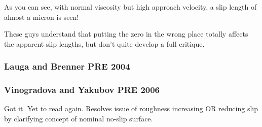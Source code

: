 \documentclass[twocolumn]{article}
\begin{document}
As you can see, with normal viscosity but high approach velocity, a slip length of almost a micron is seen!

These guys understand that putting the zero in the wrong place totally affects the apparent slip lengths, but don't quite develop a full critique.

\subsubsection*{Lauga and Brenner PRE 2004}



\subsubsection*{Vinogradova and Yakubov PRE 2006}
Got it. Yet to read again. Resolves issue of roughness increasing OR reducing slip by clarifying concept of nominal no-slip surface.
\end{document}
